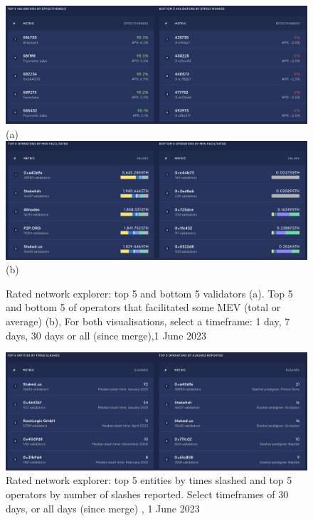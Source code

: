 \documentclass[UTF8]{article}
\begin{document}
{\begin{figure}[htbp]
\begin{center}
\includegraphics[width=\linewidth]{images/ratedtrend3}\\
(a)
\includegraphics[width=\linewidth]{images/ratedtrend4}\\
(b)
\caption{Rated network explorer: top 5 and bottom 5 validators (a).  Top 5 and bottom 5 of operators that facilitated some MEV (total or average) (b), For both visualisations, select a timeframe: 1 day, 7 days, 30 days or all (since merge),1 June 2023}
\label{fig:ratedtrend4}
\end{center}
\end{figure}

\begin{figure}[htbp]
\begin{center}
\includegraphics[width=\linewidth]{images/ratedtrend5}
\caption{Rated network explorer: top 5 entities by times slashed and top 5 operators by number of slashes reported. Select timeframes of 30 days, or all days (since merge) , 1 June 2023}
\label{fig:ratedtrend5}
\end{center}
\end{figure}

}
\end{document}
